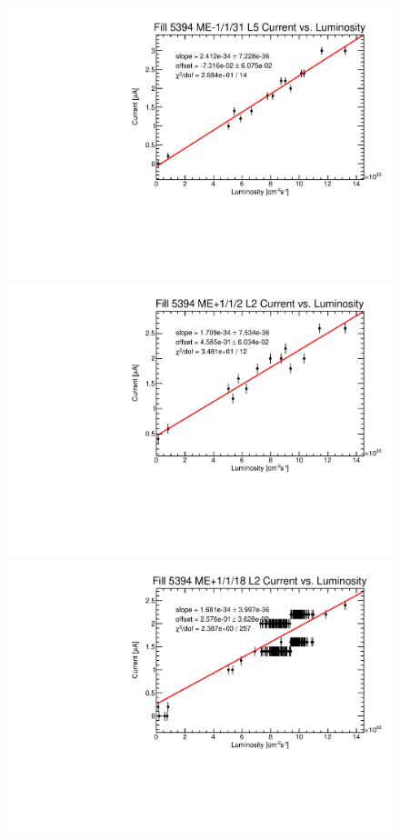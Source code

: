\begin{figure}
	\centering
	\includegraphics[width=0.7\twoThirdsFigWidth]{figures/neutron/ME11_N_31_5_f5394_curr_lumi.pdf}
	\includegraphics[width=0.7\twoThirdsFigWidth]{figures/neutron/ME11_P_02_2_f5394_curr_lumi.pdf}
	\includegraphics[width=0.7\twoThirdsFigWidth]{figures/neutron/ME11_P_18_2_f5394_curr_lumi.pdf}

\end{figure}
